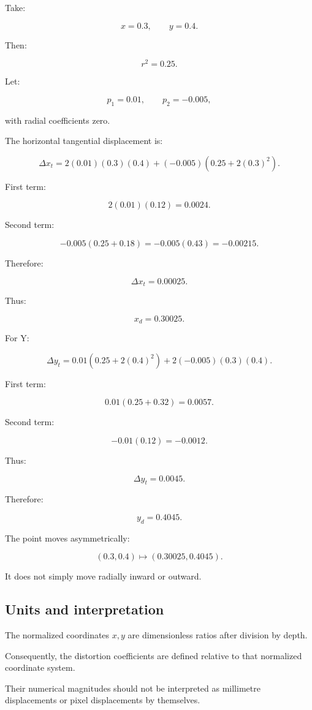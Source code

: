 Take:

\[
 x=0.3,\qquad y=0.4.
\]

Then:

\[
 r^2=0.25.
\]

Let:

\[
 p_1=0.01,\qquad p_2=-0.005,
\]

with radial coefficients zero.

The horizontal tangential displacement is:

\[
 \Delta x_t= 2(0.01)(0.3)(0.4) +(-0.005)(0.25+2(0.3)^2).
\]

First term:

\[
 2(0.01)(0.12)=0.0024.
\]

Second term:

\[
 -0.005(0.25+0.18) =-0.005(0.43) =-0.00215.
\]

Therefore:

\[
 \boxed{ \Delta x_t=0.00025 }.
\]

Thus:

\[
 \boxed{x_d=0.30025}.
\]

For Y:

\[
 \Delta y_t= 0.01(0.25+2(0.4)^2) +2(-0.005)(0.3)(0.4).
\]

First term:

\[
 0.01(0.25+0.32)=0.0057.
\]

Second term:

\[
 -0.01(0.12)=-0.0012.
\]

Thus:

\[
 \boxed{ \Delta y_t=0.0045 }.
\]

Therefore:

\[
 \boxed{y_d=0.4045}.
\]

The point moves asymmetrically:

\[
 (0.3,0.4)\mapsto(0.30025,0.4045).
\]

It does not simply move radially inward or outward.

\subsection{Units and interpretation}\label{02-foundations-ii-ch035-units-and-interpretation}

The normalized coordinates \(x,y\) are dimensionless ratios after division by depth.

Consequently, the distortion coefficients are defined relative to that normalized coordinate system.

Their numerical magnitudes should not be interpreted as millimetre displacements or pixel displacements by themselves.

